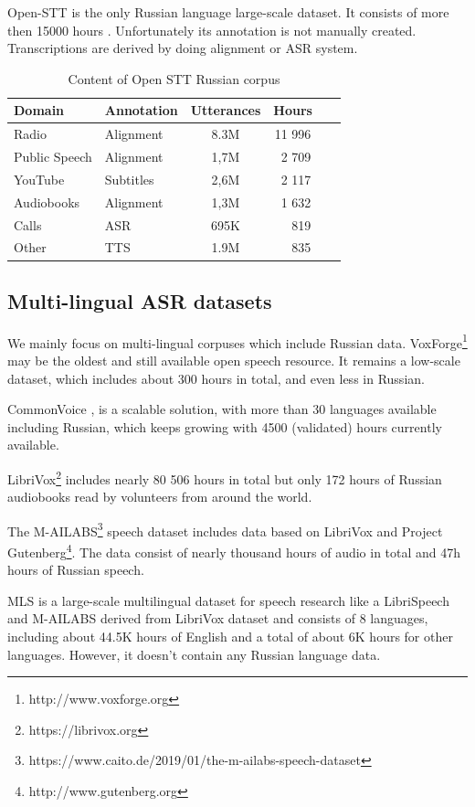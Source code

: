 \documentclass[a4paper]{article}
\begin{document}
Open-STT is the only Russian language large-scale dataset. It consists of more then 15000 hours \cite{veysov2020towardimagenetstt}. Unfortunately its annotation is not manually created. Transcriptions are derived by doing  alignment or ASR system. 

\begin{table}[th]
  \caption{Content of Open STT Russian corpus}
  \label{tab:openstt}
  \centering
  \begin{tabular}{ llcr }
    \toprule
    Domain & Annotation & Utterances & Hours~~~  \\
    \midrule
    Radio &     Alignment & 8.3M & 11 996 ~~~  \\
    Public Speech & Alignment  & 1,7M & 2 709 ~~~ \\
    YouTube & Subtitles  & 2,6M & 2 117 ~~~ \\
    Audiobooks & Alignment  & 1,3M & 1 632 ~~~ \\
    Calls & ASR  & 695K & 819 ~~~ \\
    Other & TTS  & 1.9M & 835 ~~~ \\
    \bottomrule
  \end{tabular}
\end{table}

\subsection{Multi-lingual ASR datasets}

We mainly focus on multi-lingual corpuses which include Russian data. VoxForge\footnote{http://www.voxforge.org} may be the oldest and still available open speech resource. It remains a low-scale dataset, which includes about 300 hours in total, and even less in Russian.

CommonVoice \cite{ardila2019common}, is a scalable solution, with more than 30 languages available including Russian, which keeps growing with 4500 (validated) hours currently available.

LibriVox\footnote{https://librivox.org} includes nearly 80 506 hours in total but only 172 hours of Russian audiobooks read by volunteers from around the world.

The M-AILABS\footnote{https://www.caito.de/2019/01/the-m-ailabs-speech-dataset} speech dataset includes data based on LibriVox and Project Gutenberg\footnote{http://www.gutenberg.org}. The data consist of nearly thousand hours of audio in total and 47h hours of Russian speech.

MLS \cite{pratap2020mls} is a large-scale multilingual dataset for speech research like a LibriSpeech and M-AILABS derived from LibriVox dataset and consists of 8 languages, including about 44.5K hours of English and a total of about 6K hours for other languages. However, it doesn't contain any Russian language data.
\end{document}
